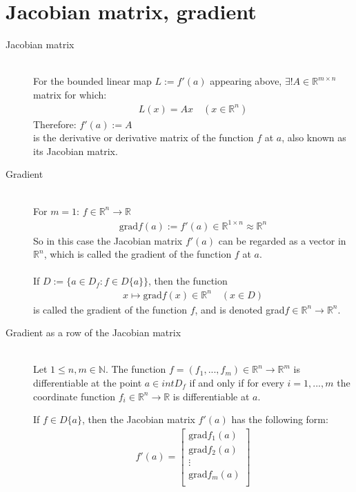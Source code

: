 \documentclass[margin=0px]{article}
\newcommand{\R}{\mathbb{R}}
\begin{document}
\section{Jacobian matrix, gradient}
\begin{description}
    \item[Jacobian matrix] \hfill \\
        For the bounded linear map $ L := f'(a) $ appearing above, $ \exists!A\in\R^{m\times n}$ matrix for which:
        \begin{align*}
            L(x) = Ax \quad (x\in\R^n)
        \end{align*}
        Therefore:
        $ f'(a) := A $\\
        is the derivative or derivative matrix of the function $f$ at $a$, also known as its Jacobian matrix.
    \item[Gradient] \hfill \\
        For $m = 1$: $ f \in \R^n \rightarrow \R $
        \begin{align*}
            \textrm{grad}f(a) := f'(a) \in \R^{1\times n} \approx \R^n
        \end{align*}
        So in this case the Jacobian matrix $f'(a)$ can be regarded as a vector in $\R^n$, which is called the gradient of the function $f$ at $a$.
        \\\\
        If $ D := \{a \in D_f : f \in D\{a\} \} $, then the function
        \begin{align*}
            x \mapsto \textrm{grad}f(x) \in \R^n \quad (x \in D)
        \end{align*}
        is called the gradient of the function $f$, and is denoted grad$f \in \R^n \rightarrow \R^n$.
    \item[Gradient as a row of the Jacobian matrix] \hfill \\
        Let $1 \leq n, m \in \mathbb{N}$. The function $f = (f_1, ..., f_m) \in \R^n \rightarrow \R^m$ is differentiable at the point $ a \in intD_f$ if and only if for every $ i = 1, ..., m $ the
        coordinate function $f_i \in \R^n \rightarrow \R$ is differentiable at $a$.

        If $f \in D\{a\}$, then the Jacobian matrix $f'(a)$ has the following form:
        \begin{align*}
            f'(a) =
            \begin{bmatrix}
                \textrm{grad}f_{1}(a) \\
                \textrm{grad}f_{2}(a) \\
                \vdots                \\
                \textrm{grad}f_{m}(a) \\
            \end{bmatrix}
        \end{align*}
\end{description}
\end{document}
